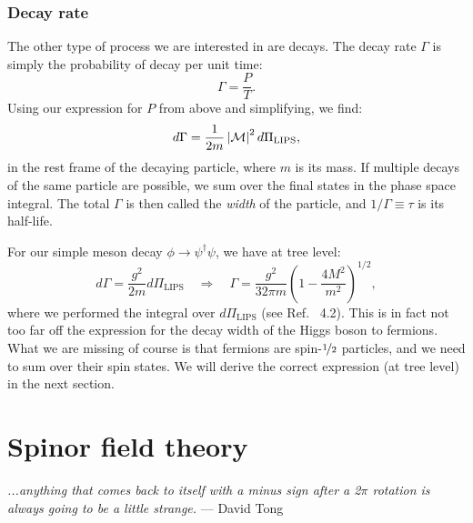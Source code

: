 \subsubsection{Decay rate}

The other type of process we are interested in are decays.
The decay rate $\Gamma$ is simply the probability of decay per unit time:
\begin{equation}
	\label{eq:01_qft_interactions_decay_rate}
	\Gamma =  \frac{P}{T}.
\end{equation}
Using our expression for $P$ from above and simplifying, we find:
\begin{equation}
	\label{eq:01_qft_interactions_differential_decay_rate}
	d\Gamma = \frac{1}{2m} \left\lvert \mathcal M \right\rvert^2 d\Pi_{\mathrm{LIPS}},
\end{equation}
in the rest frame of the decaying particle, where $m$ is its mass.
If multiple decays of the same particle are possible, we sum over the final states in the phase space integral.
The total $\Gamma$ is then called the \textit{width} of the particle, and $1/\Gamma \equiv \tau$ is its half-life.

For our simple meson decay $\phi \rightarrow \psi^\dagger\psi$, we have at tree level:
\begin{equation}
	\label{eq:01_qft_interactions_decay_rate_meson_decay}
	d\Gamma = \frac{g^2}{2m} d\Pi_{\mathrm{LIPS}} \quad \Rightarrow \quad \Gamma = \frac{g^2}{32\pi m} \left(1 - \frac{4M^2}{m^2}\right)^{1/2},
\end{equation}
where we performed the integral over $d\Pi_{\mathrm{LIPS}}$ (see Ref.~\cite{XianyuPSSolutions} 4.2).
This is in fact not too far off the expression for the decay width of the Higgs boson to fermions.
What we are missing of course is that fermions are spin-$\cnicefrac{1}{2}$ particles, and we need to sum over their spin states.
We will derive the correct expression (at tree level) in the next section.

\section{Spinor field theory}
\label{sec:01_qft_spinors}

\begin{center}
	\centering
	\noindent
	\textit{...anything that comes back to itself with a minus sign after a 2$\pi$ rotation is always going to be a little strange.} --- David Tong~\cite{TongSM}
\end{center}

